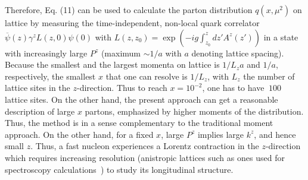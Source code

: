 Therefore, Eq. (11) can be used to calculate the parton distribution $q(x,\mu^2)$ on lattice by measuring
the time-independent, non-local quark correlator $\overline{\psi}(z)\gamma^zL(z,0)\psi(0)$ with
$L(z,z_0) = \exp\left(-ig\int^{z}_{z_0} dz' A^z(z') \right)$ in a state with increasingly large $P^z$
(maximum $\sim 1/a$ with $a$ denoting lattice spacing).
Because the smallest and the largest momenta on lattice is $1/L_z a$ and $1/a$, respectively,
the smallest $x$ that one can resolve is $1/L_z$, with $L_z$ the number of lattice sites in the $z$-direction.
Thus to reach $x = 10^{-2}$, one has to have $~100$ lattice sites. On the other hand, the present approach can get a
reasonable description of large $x$ partons, emphasized by higher moments of the distribution. Thus, the method is
in a sense complementary to the traditional moment approach. On the other hand, for a fixed $x$, large $P^z$ implies large $k^z$,
and hence small $z$. Thus, a fast nucleon experiences a Lorentz contraction in the $z$-direction which requires
increasing resolution (anistropic lattices such as ones used for spectroscopy calculations~\cite{Edwards:2011jj}) to study its longitudinal structure.

